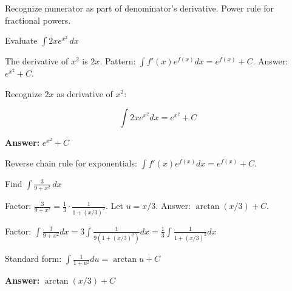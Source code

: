 \begin{takeaways}
Recognize numerator as part of denominator's derivative. Power rule for fractional powers.
\end{takeaways}

\vspace{1cm}

\begin{problem}
Evaluate $\displaystyle \int 2x e^{x^2} \, dx$
\end{problem}

\begin{hint}
The derivative of $x^2$ is $2x$. Pattern: $\int f'(x) e^{f(x)} dx = e^{f(x)} + C$. Answer: $e^{x^2} + C$.
\end{hint}

\begin{solution}
Recognize $2x$ as derivative of $x^2$:

\[
\int 2x e^{x^2} dx = e^{x^2} + C
\]

\textbf{Answer:} $\boxed{e^{x^2} + C}$
\end{solution}

\begin{takeaways}
Reverse chain rule for exponentials: $\int f'(x)e^{f(x)}dx = e^{f(x)} + C$.
\end{takeaways}

\vspace{1cm}

\begin{problem}
Find $\displaystyle \int \frac{3}{9 + x^2} \, dx$
\end{problem}

\begin{hint}
Factor: $\frac{3}{9 + x^2} = \frac{1}{3} \cdot \frac{1}{1 + (x/3)^2}$. Let $u = x/3$. Answer: $\arctan(x/3) + C$.
\end{hint}

\begin{solution}
Factor: $\displaystyle \int \frac{3}{9+x^2}dx = 3\int \frac{1}{9(1+(x/3)^2)}dx = \frac{1}{3}\int \frac{1}{1+(x/3)^2}dx$

Standard form: $\displaystyle \int \frac{1}{1+u^2}du = \arctan u + C$

\textbf{Answer:} $\boxed{\arctan(x/3) + C}$
\end{solution}

